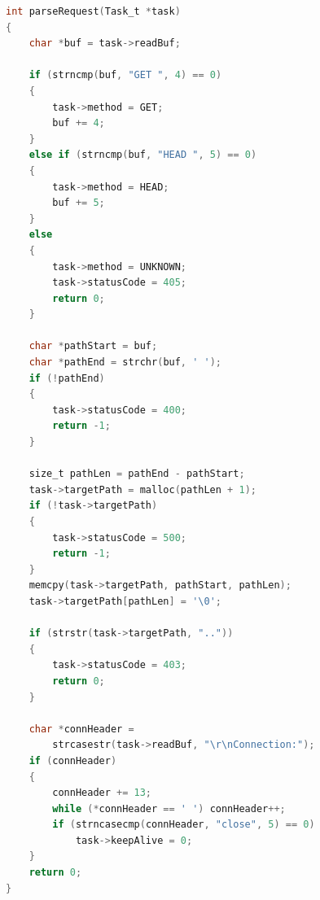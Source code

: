 \begin{lstlisting}[caption={Реализация функции парсинг HTTP-запроса},label={lst:parse_request},language=C]
int parseRequest(Task_t *task)
{
    char *buf = task->readBuf;

    if (strncmp(buf, "GET ", 4) == 0)
    {
        task->method = GET;
        buf += 4;
    }
    else if (strncmp(buf, "HEAD ", 5) == 0)
    {
        task->method = HEAD;
        buf += 5;
    }
    else
    {
        task->method = UNKNOWN;
        task->statusCode = 405;
        return 0;
    }

    char *pathStart = buf;
    char *pathEnd = strchr(buf, ' ');
    if (!pathEnd)
    {
        task->statusCode = 400;
        return -1;
    }

    size_t pathLen = pathEnd - pathStart;
    task->targetPath = malloc(pathLen + 1);
    if (!task->targetPath)
    {
        task->statusCode = 500;
        return -1;
    }
    memcpy(task->targetPath, pathStart, pathLen);
    task->targetPath[pathLen] = '\0';

    if (strstr(task->targetPath, ".."))
    {
        task->statusCode = 403;
        return 0;
    }

    char *connHeader =
        strcasestr(task->readBuf, "\r\nConnection:");
    if (connHeader)
    {
        connHeader += 13;
        while (*connHeader == ' ') connHeader++;
        if (strncasecmp(connHeader, "close", 5) == 0)
            task->keepAlive = 0;
    }
    return 0;
}
\end{lstlisting}

